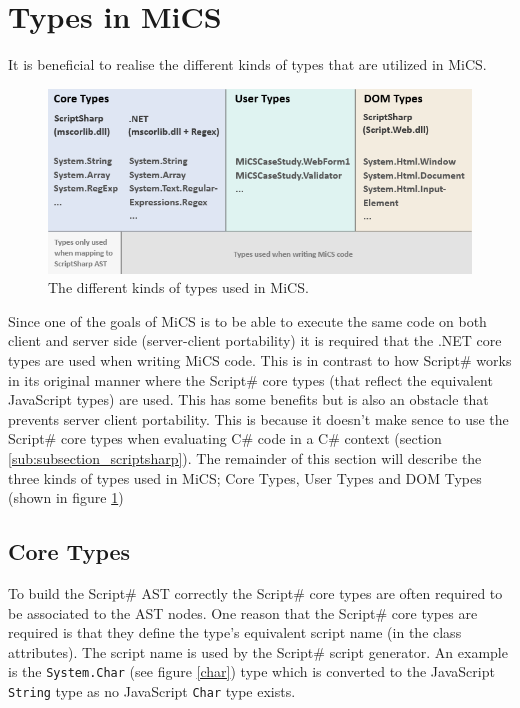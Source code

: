 \section{Types in MiCS} %
\label{sec:types_in_mics}
	It is beneficial to realise the different kinds of types that are utilized in MiCS.

	\begin{figure}[H]
		\begin{center}
			\centerline{\includegraphics[width=16cm]{resources/images/TypesOverview.png}}
		\end{center}
		\caption{The different kinds of types used in MiCS.}
		\label{typesOverview}
	\end{figure}

	Since one of the goals of MiCS is to be able to execute the same code on both client and server side (server-client portability) it is required that the .NET core types are used when writing MiCS code. This is in contrast to how Script\# works in its original manner where the Script\# core types (that reflect the equivalent JavaScript types) are used. This has some benefits but is also an obstacle that prevents server client portability. This is because it doesn't make sence to use the Script\# core types when evaluating C\# code in a C\# context (section \ref{sub:subsection_scriptsharp}). The remainder of this section will describe the three kinds of types used in MiCS; Core Types, User Types and DOM Types (shown in figure \ref{typesOverview})

	\subsection{Core Types} %
	\label{sub:core_types}
		To build the Script\# AST correctly the Script\# core types are often required to be associated to the AST nodes. One reason that the Script\# core types are required is that they define the type's equivalent script name (in the class attributes). The script name is used by the Script\# script generator. An example is the \texttt{System.Char} (see figure \ref{char}) type which is converted to the JavaScript \texttt{String} type as no JavaScript \texttt{Char} type exists.

